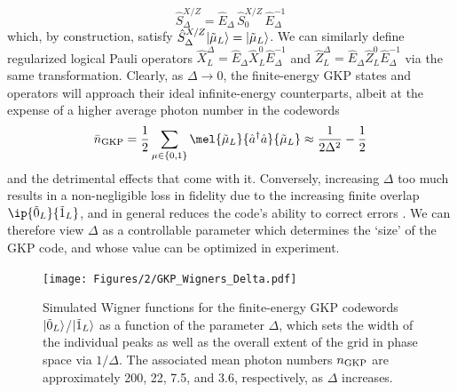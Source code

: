 \begin{equation}
    \hat{S}_\Delta^{X/Z} = \hat{E}_\Delta\,\hat{S}_0^{X/Z}\,\hat{E}_\Delta^{-1}
\end{equation}
which, by construction, satisfy $\hat{S}_\Delta^{X/Z}\lvert\tilde{\mu}_L\rangle = \lvert\tilde{\mu}_L\rangle$. We can similarly define regularized logical Pauli operators $\hat{X}_L^\Delta = \hat{E}_\Delta \hat{X}_L^0 \hat{E}_\Delta^{-1}$ and $\hat{Z}_L^\Delta = \hat{E}_\Delta \hat{Z}_L^0 \hat{E}_\Delta^{-1}$ via the same transformation. Clearly, as $\Delta \to 0$, the finite-energy GKP states and operators will approach their ideal infinite-energy counterparts, albeit at the expense of a higher average photon number in the codewords 
\begin{equation}
    \bar{n}_{\rm GKP} = \frac{1}{2} \sum_{\mu\in \{0,1\}} \mel{\tilde{\mu}_L}{\hat{a}^\dagger\hat{a}}{\tilde{\mu}_L} \approx \frac{1}{2\Delta^2} - \frac{1}{2}
\end{equation}
and the detrimental effects that come with it. Conversely, increasing $\Delta$ too much results in a non-negligible loss in fidelity due to the increasing finite overlap $\ip{\tilde{0}_L}{\tilde{1}_L}$, and in general reduces the code's ability to correct errors \cite{royer2020gkp}. We can therefore view $\Delta$ as a controllable parameter which determines the `size' of the GKP code, and whose value can be optimized in experiment. 



\begin{figure}[h]
    \centering
    \texttt{[image: Figures/2/GKP\_Wigners\_Delta.pdf]}
    \caption{Simulated Wigner functions for the finite-energy GKP codewords $\lvert\tilde{0}_L\rangle$/$\lvert\tilde{1}_L\rangle$ as a function of the parameter $\Delta$, which sets the width of the individual peaks as well as the overall extent of the grid in phase space via $1/\Delta$. The associated mean photon numbers $n_{\rm GKP}$ are approximately 200, 22, 7.5, and 3.6, respectively, as $\Delta$ increases.}
    \label{fig:2_GKP_Wigners_Delta}
\end{figure}

